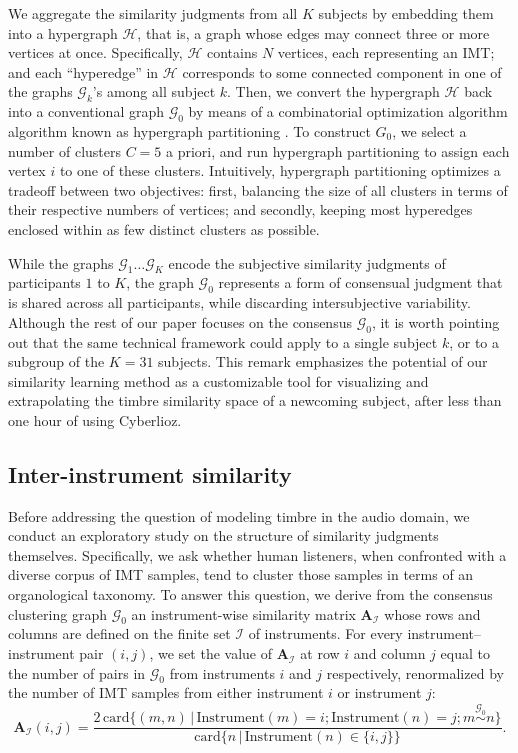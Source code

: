 \documentclass{bmcart}
\newcommand{\Card}{\mathrm{card}}
\begin{document}
We aggregate the similarity judgments from all $K$ subjects by embedding them into a hypergraph $\mathcal{H}$, that is, a graph whose edges may connect three or more vertices at once.
Specifically, $\mathcal{H}$ contains $N$ vertices, each representing an IMT; and each ``hyperedge'' in $\mathcal{H}$ corresponds to some connected component in one of the graphs $\mathcal{G}_k$'s among all subject $k$.
Then, we convert the hypergraph $\mathcal{H}$ back into a conventional graph $\mathcal{G}_0$ by means of a combinatorial optimization algorithm algorithm known as hypergraph partitioning \cite{kernighan1970efficient,han1997scalable,strehl2002cluster}. %
To construct $G_0$, we select a number of clusters $C=5$ a priori, and run hypergraph partitioning to assign each vertex $i$ to one of these clusters.
Intuitively, hypergraph partitioning optimizes a tradeoff between two objectives: first, balancing the size of all clusters in terms of their respective numbers of vertices; and secondly, keeping most hyperedges enclosed within as few distinct clusters as possible.

While the graphs $\mathcal{G}_1 \ldots \mathcal{G}_K$ encode the subjective similarity judgments of participants $1$ to $K$, the graph $\mathcal{G}_0$ represents a form of consensual judgment that is shared across all participants, while discarding intersubjective variability.
Although the rest of our paper focuses on the consensus $\mathcal{G}_0$, it is worth pointing out that the same technical framework could apply to a single subject $k$, or to a subgroup of the $K=31$ subjects.
This remark emphasizes the potential of our similarity learning method as a customizable tool for visualizing and extrapolating the timbre similarity space of a newcoming subject, after less than one hour of using Cyberlioz.


\subsection*{Inter-instrument similarity}

Before addressing the question of modeling timbre in the audio domain, we conduct an exploratory study on the structure of similarity judgments themselves.
Specifically, we ask whether human listeners, when confronted with a diverse corpus of IMT samples, tend to cluster those samples in terms of an organological taxonomy.
To answer this question, we derive from the consensus clustering graph $\mathcal{G}_0$ an instrument-wise similarity matrix $\mathbf{A}_{\mathcal{I}}$ whose rows and columns are defined on the finite set $\mathcal{I}$ of instruments.
For every instrument--instrument pair $(i,j)$, we set the value of $\mathbf{A}_{\mathcal{I}}$ at row $i$ and column $j$ equal to the number of pairs in $\mathcal{G}_0$ from instruments $i$ and $j$ respectively, renormalized by the number of IMT samples from either instrument $i$ or instrument $j$:
\[
\mathbf{A}_{\mathcal{I}}(i,j) = \dfrac{
2\,\Card \big\{ (m, n) \,\vert\, \mathrm{Instrument}(m)=i ; \mathrm{Instrument}(n)=j ; m \overset{\mathcal{G}_0}{\sim} n \big\}
}{
\Card \big\{n \,\vert\, \mathrm{Instrument}(n) \in \{ i, j \} \big\}
}.
\label{eq:instrument-similarity}
\]
\end{document}
